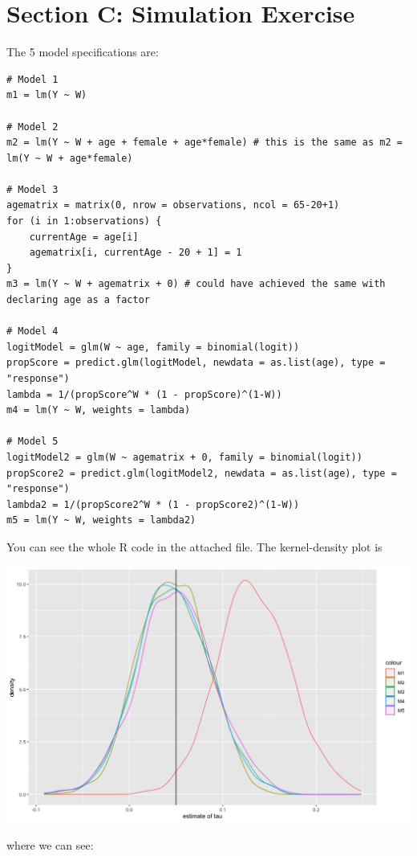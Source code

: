 \documentclass{article}
\begin{document}
	\section*{Section C: Simulation Exercise}
	The 5 model specifications are:
	\begin{lstlisting}[tabsize=2]
# Model 1
m1 = lm(Y ~ W)

# Model 2
m2 = lm(Y ~ W + age + female + age*female) # this is the same as m2 = lm(Y ~ W + age*female)

# Model 3
agematrix = matrix(0, nrow = observations, ncol = 65-20+1)
for (i in 1:observations) {
	currentAge = age[i]
	agematrix[i, currentAge - 20 + 1] = 1
}
m3 = lm(Y ~ W + agematrix + 0) # could have achieved the same with declaring age as a factor

# Model 4
logitModel = glm(W ~ age, family = binomial(logit))
propScore = predict.glm(logitModel, newdata = as.list(age), type = "response")
lambda = 1/(propScore^W * (1 - propScore)^(1-W))
m4 = lm(Y ~ W, weights = lambda)

# Model 5
logitModel2 = glm(W ~ agematrix + 0, family = binomial(logit))
propScore2 = predict.glm(logitModel2, newdata = as.list(age), type = "response")
lambda2 = 1/(propScore2^W * (1 - propScore2)^(1-W))
m5 = lm(Y ~ W, weights = lambda2)
	\end{lstlisting}
	You can see the whole R code in the attached file. The kernel-density plot is
	\begin{center}
		\includegraphics[scale=0.3]{kde}
	\end{center}
	where we can see:
\end{document}
